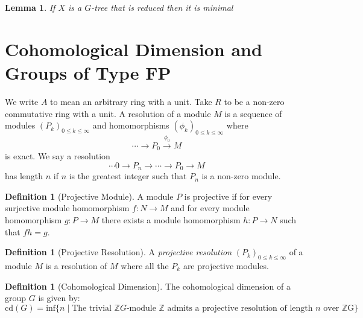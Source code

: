 \documentclass[12pt,parskip=full]{report}
\theoremstyle{plain}
\newtheorem{lem}[thm]{Lemma}
\theoremstyle{definition}
\newtheorem{dfn}[thm]{Definition}
\begin{document}







\begin{lem}
    \label{reducedcocompact}
    If \(X\) is a \(G\)-tree that is reduced then it is minimal
\end{lem}


\section{Cohomological Dimension and Groups of Type FP}


We write \(A\) to mean an arbitrary ring with a unit. Take \(R\) to be a non-zero commutative ring with a unit. A resolution of a module \(M\) is a sequence of modules \((P_k)_{0\leq k\leq \infty}\) and homomorphisms \((\phi_k)_{0\leq k\leq \infty}\) where \[\cdots \to P_0 \overset{\phi_0}{\to} M\] is exact. We say a resolution \[\cdots 0\to P_n\to \cdots\to P_0 \to M\] has length \(n\) if \(n\) is the greatest integer such that \(P_n\) is a non-zero module.

\begin{dfn}
    [Projective Module]
    A module \(P\) is projective if for every surjective module homomorphism \(f: N\to M\) and for every module homomorphism \(g: P\to M\) there exists a module homomorphism \(h: P\to N\) such that \(fh = g\).
\end{dfn}

\begin{dfn}
    [Projective Resolution]
    A \emph{projective resolution} \((P_k)_{0\leq k\leq \infty}\) of a module \(M\) is a resolution of \(M\) where all the \(P_k\) are projective modules.
\end{dfn}

\begin{dfn}
[Cohomological Dimension]
The cohomological dimension of a group \(G\) is given by:
\[
    \text{cd}(G) = \text{inf}\{n\mid\text{The trivial }\mathbb{Z}G\text{-module }\mathbb{Z}\text{ admits a projective resolution of length \(n\) over \(\mathbb{Z}\)G}\}
\]
\end{dfn}
\end{document}
